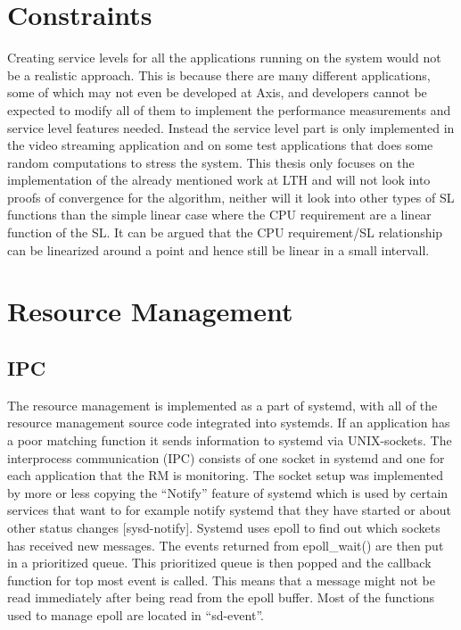 \documentclass[nobiblatex]{LTHthesis}
\begin{document}
\section{Constraints} %
Creating service levels for all the applications running on the system would not be a realistic approach. This is because there are many different applications, some of which may not even be developed at Axis, and developers cannot be expected to modify all of them to implement the performance measurements and service level features needed. Instead the service level part is only implemented in the video streaming application and on some test applications that does some random computations to stress the system. This thesis only focuses on the implementation of the already mentioned work at LTH and will not look into proofs of convergence for the algorithm, neither will it look into other types of SL functions than the simple linear case where the CPU requirement are a linear function of the SL. It can be argued that the CPU requirement/SL relationship can be linearized around a point and hence still be linear in a small intervall.

\section{Resource Management} 


\subsection{IPC}
The resource management is implemented as a part of systemd, with all of the resource management source code integrated into systemds. If an application has a poor matching function it sends information to systemd via UNIX-sockets. The interprocess communication (IPC) consists of one socket in systemd and one for each application that the RM is monitoring. The socket setup was implemented by more or less copying the “Notify” feature of systemd which is used by certain services that want to for example notify systemd that they have started or about other status changes [sysd-notify].
Systemd uses epoll to find out which sockets has received new messages. The events returned from epoll\_wait() are then put in a prioritized queue. This prioritized queue is then popped and the callback function for top most event is called. This means that a message might not be read immediately after being read from the epoll buffer. Most of the functions used to manage epoll are located in “sd-event”. 
\end{document}
